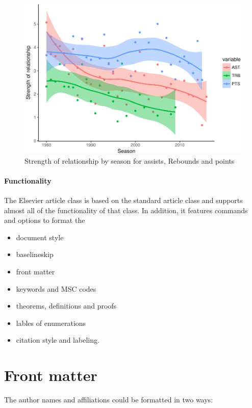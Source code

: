 \documentclass[]{elsarticle} %
\makeatletter
\def\maxwidth{\ifdim\Gin@nat@width>\linewidth\linewidth
\else\Gin@nat@width\fi}
\let\Oldincludegraphics\includegraphics
\renewcommand{\includegraphics}[1]{\Oldincludegraphics[width=\maxwidth]{#1}}
\makeatother
\begin{document}
\begin{figure}[htbp]
\centering
\includegraphics{Coaching_Selection_files/figure-latex/unnamed-chunk-6-1.pdf}
\caption{Strength of relationship by season for assists, Rebounds and
points}
\end{figure}

\paragraph{Functionality}\label{functionality}

The Elsevier article class is based on the standard article class and
supports almost all of the functionality of that class. In addition, it
features commands and options to format the

\begin{itemize}
\item
  document style
\item
  baselineskip
\item
  front matter
\item
  keywords and MSC codes
\item
  theorems, definitions and proofs
\item
  lables of enumerations
\item
  citation style and labeling.
\end{itemize}

\section{Front matter}\label{front-matter}

The author names and affiliations could be formatted in two ways:
\end{document}
